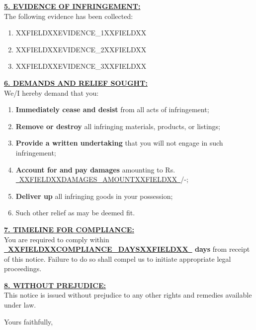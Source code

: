 \documentclass[12pt,a4paper]{article}
\newcommand{\fillline}[1]{\underline{~#1~}}
\begin{document}
\noindent\textbf{\uline{5. EVIDENCE OF INFRINGEMENT:}}\\
The following evidence has been collected:

\begin{enumerate}[label=(\alph*)]
    \item XXFIELDXXEVIDENCE_1XXFIELDXX
    \item XXFIELDXXEVIDENCE_2XXFIELDXX
    \item XXFIELDXXEVIDENCE_3XXFIELDXX
\end{enumerate}

\vspace{1em}

\noindent\textbf{\uline{6. DEMANDS AND RELIEF SOUGHT:}}\\
We/I hereby demand that you:

\begin{enumerate}[label=(\alph*)]
    \item \textbf{Immediately cease and desist} from all acts of infringement;
    \item \textbf{Remove or destroy} all infringing materials, products, or listings;
    \item \textbf{Provide a written undertaking} that you will not engage in such infringement;
    \item \textbf{Account for and pay damages} amounting to Rs. \fillline{XXFIELDXXDAMAGES_AMOUNTXXFIELDXX}/-;
    \item \textbf{Deliver up} all infringing goods in your possession;
    \item Such other relief as may be deemed fit.
\end{enumerate}

\vspace{1em}

\noindent\textbf{\uline{7. TIMELINE FOR COMPLIANCE:}}\\
You are required to comply within \textbf{\fillline{XXFIELDXXCOMPLIANCE_DAYSXXFIELDXX} days} from receipt
of this notice. Failure to do so shall compel us to initiate appropriate legal proceedings.

\vspace{1em}

\noindent\textbf{\uline{8. WITHOUT PREJUDICE:}}\\
This notice is issued without prejudice to any other rights and remedies available under law.

\vspace{2em}

\noindent Yours faithfully,
\end{document}
